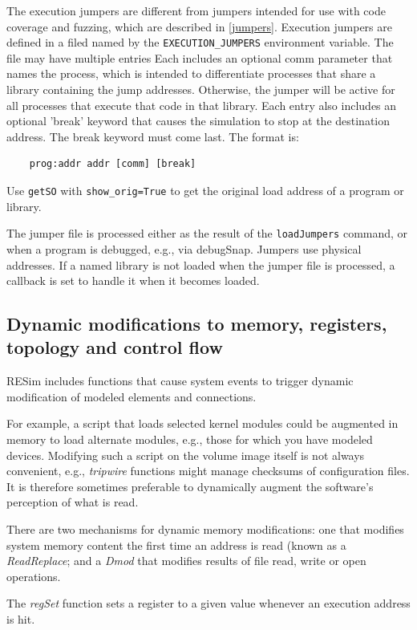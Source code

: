 \documentclass[titlepage]{article}
\begin{document}
The execution jumpers are different from jumpers intended for use with code coverage and fuzzing,
which are described in \ref{jumpers}.
Execution jumpers are defined in a filed named by the {\tt EXECUTION\_JUMPERS} environment variable.
The file may have multiple entries
Each includes an optional comm parameter that names the process,
which is intended to differentiate processes that share a library containing the jump 
addresses. Otherwise, the jumper will be active for all processes that execute that code
in that library. Each entry also includes an optional 'break' keyword that causes the
simulation to stop at the destination address. The break keyword must come last.
The format is:

\begin{verbatim}
    prog:addr addr [comm] [break]
\end{verbatim}
Use {\tt getSO} with {\tt show\_orig=True} to get the original load address of a program or library.

The jumper file is processed either as the result of the {\tt loadJumpers} command, or when a program
is debugged, e.g., via debugSnap.  Jumpers use physical addresses.  If a named library is not loaded 
when the jumper file is processed, a callback is set to handle it when it becomes loaded.  

\subsection{Dynamic modifications to memory, registers, topology and control flow}
\label{dmod}
RESim includes functions that cause system events to trigger dynamic modification of modeled elements and connections.

For example, a script that loads selected kernel modules could be augmented in memory to
load alternate modules, e.g., those for which you have modeled devices.  Modifying such a script on the volume
image itself is not always convenient, e.g., \textit{tripwire} functions might manage checksums of
configuration files.  It is therefore sometimes preferable to dynamically augment the software's perception of what is read.

There are two mechanisms for dynamic memory modifications: one that modifies system memory content the first time an address is
read (known as a \textit{ReadReplace}; and a \textit{Dmod} that modifies results of file read, write or open operations.

The \textit{regSet} function sets a register to a given value whenever an execution address is hit.
\end{document}
